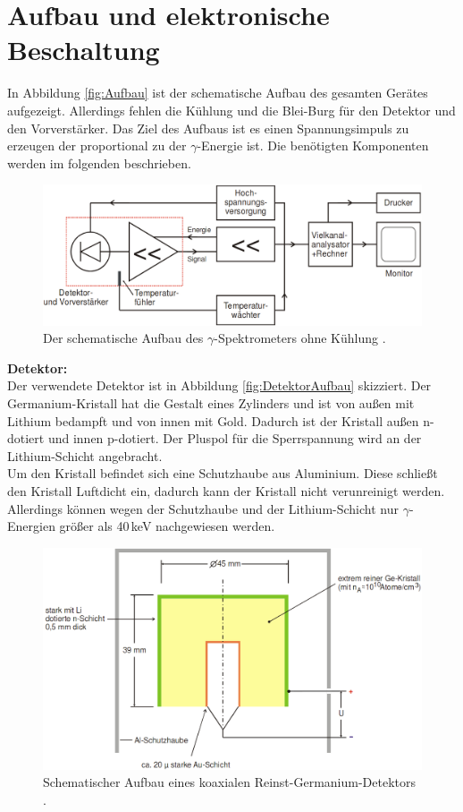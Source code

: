 \section{Aufbau und elektronische Beschaltung}
In Abbildung \eqref{fig:Aufbau} ist der schematische Aufbau des gesamten Gerätes aufgezeigt. Allerdings fehlen die Kühlung und die Blei-Burg für den Detektor und den Vorverstärker. Das Ziel des Aufbaus ist es einen Spannungsimpuls zu erzeugen der proportional zu der $\gamma$-Energie ist. Die benötigten Komponenten werden im folgenden beschrieben.

\begin{figure}[H]
  \centering
  \includegraphics[width=\linewidth]{Bilder/Aufbau.png}
  \caption{Der schematische Aufbau des $\gamma$-Spektrometers ohne Kühlung \cite{V18}.}
  \label{fig:Aufbau}
\end{figure}

\textbf{Detektor:} \\
Der verwendete Detektor ist in Abbildung \eqref{fig:DetektorAufbau} skizziert. Der Germanium-Kristall hat die Gestalt eines Zylinders und ist von außen mit Lithium bedampft und von innen mit Gold. Dadurch ist der Kristall außen n-dotiert und innen p-dotiert. Der Pluspol für die Sperrspannung wird an der Lithium-Schicht angebracht. \\
Um den Kristall befindet sich eine Schutzhaube aus Aluminium. Diese schließt den Kristall Luftdicht ein, dadurch kann der Kristall nicht verunreinigt werden. Allerdings können wegen der Schutzhaube und der Lithium-Schicht nur $\gamma$-Energien größer als 40\,keV nachgewiesen werden.

\begin{figure}[H]
  \centering
  \includegraphics[width=0.9\linewidth]{Bilder/Germanium-Detektor.png}
  \caption{Schematischer Aufbau eines koaxialen Reinst-Germanium-Detektors \cite{V18}.}
  \label{fig:DetektorAufbau}
\end{figure}

